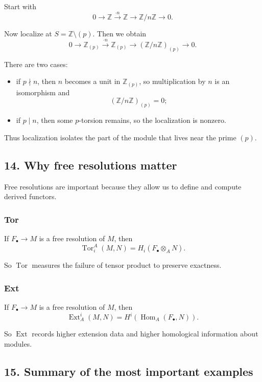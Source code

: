 \documentclass[12pt,a4paper]{article}
\theoremstyle{notespace}
\theoremstyle{definition}
\begin{document}
Start with
\[
0 \longrightarrow \mathbb Z \xrightarrow{\cdot n} \mathbb Z \longrightarrow \mathbb Z/n\mathbb Z \longrightarrow 0.
\]

Now localize at \(S=\mathbb Z\setminus (p)\). Then we obtain
\[
0 \longrightarrow \mathbb Z_{(p)} \xrightarrow{\cdot n} \mathbb Z_{(p)}
\longrightarrow (\mathbb Z/n\mathbb Z)_{(p)} \longrightarrow 0.
\]

There are two cases:
\begin{itemize}
	\item if \(p\nmid n\), then \(n\) becomes a unit in \(\mathbb Z_{(p)}\), so multiplication by \(n\) is an isomorphism and
	\[
	(\mathbb Z/n\mathbb Z)_{(p)}=0;
	\]
	\item if \(p\mid n\), then some \(p\)-torsion remains, so the localization is nonzero.
\end{itemize}

Thus localization isolates the part of the module that lives near the prime \((p)\).

\subsection{14. Why free resolutions matter}

Free resolutions are important because they allow us to define and compute derived functors.

\subsubsection*{Tor}

If \(F_\bullet \to M\) is a free resolution of \(M\), then
\[
\operatorname{Tor}_i^A(M,N)=H_i(F_\bullet\otimes_A N).
\]

So \(\operatorname{Tor}\) measures the failure of tensor product to preserve exactness.

\subsubsection*{Ext}

If \(F_\bullet \to M\) is a free resolution of \(M\), then
\[
\operatorname{Ext}^i_A(M,N)=H^i(\operatorname{Hom}_A(F_\bullet,N)).
\]

So \(\operatorname{Ext}\) records higher extension data and higher homological information about modules.

\subsection{15. Summary of the most important examples}
\end{document}
